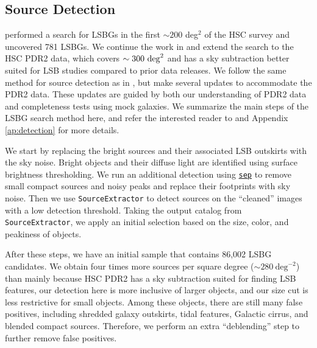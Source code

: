 \documentclass[twocolumn,astrosymb,twocolappendix,linenumbers]{aastex631}
\newcommand{\code}[1]{\texttt{#1}}
\begin{document}
\begin{CJK*}{UTF8}{gbsn}
\subsection{Source Detection}\label{sec:detection}
 performed a search for LSBGs in the first $\sim 200$ deg$^2$ of the HSC survey and uncovered 781 LSBGs. We continue the work in  and extend the search to the HSC PDR2 data, which covers $\sim 300\ \rm{deg}^{2}$ and has a sky subtraction better suited for LSB studies compared to prior data releases. We follow the same method for source detection as in , but make several updates to accommodate the PDR2 data. These updates are guided by both our understanding of PDR2 data and completeness tests using mock galaxies. We summarize the main steps of the LSBG search method here, and refer the interested reader to  and Appendix \ref{ap:detection} for more details. 

We start by replacing the bright sources and their associated LSB outskirts with the sky noise. Bright objects and their diffuse light are identified using surface brightness thresholding. We run an additional detection using \href{https://sep.readthedocs.io/en/v1.1.x}{\code{sep}} \citep{Barbary2016} to remove small compact sources and noisy peaks and replace their footprints with sky noise. Then we use \code{SourceExtractor} to detect sources on the ``cleaned'' images with a low detection threshold. Taking the output catalog from \code{SourceExtractor}, we apply an initial selection based on the size, color, and peakiness of objects. 

After these steps, we have an initial sample that contains 86,002 LSBG candidates. We obtain four times more sources per square degree ($\sim 280\ \mathrm{deg}^{-2}$) than  mainly because HSC PDR2 has a sky subtraction suited for finding LSB features, our detection here is more inclusive of larger objects, and our size cut is less restrictive for small objects. Among these objects, there are still many false positives, including shredded galaxy outskirts, tidal features, Galactic cirrus, and blended compact sources. Therefore, we perform an extra ``deblending'' step to further remove false positives.  




\end{CJK*}
\end{document}

